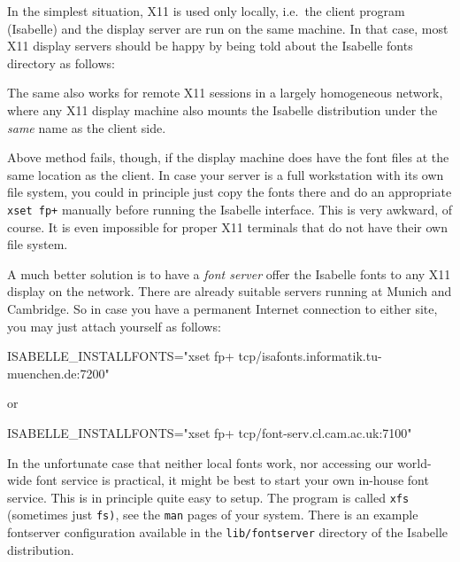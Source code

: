 \medskip In the simplest situation, X11 is used only locally, i.e.\ the client
program (Isabelle) and the display server are run on the same machine. In that
case, most X11 display servers should be happy by being told about the
Isabelle fonts directory as follows:
The same also works for remote X11 sessions in a largely homogeneous network,
where any X11 display machine also mounts the Isabelle distribution under the
\emph{same} name as the client side.

\medskip Above method fails, though, if the display machine does have the font
files at the same location as the client. In case your server is a full
workstation with its own file system, you could in principle just copy the
fonts there and do an appropriate \texttt{xset~fp+} manually before running
the Isabelle interface. This is very awkward, of course. It is even impossible
for proper X11 terminals that do not have their own file system.

A much better solution is to have a \emph{font server} offer the Isabelle
fonts to any X11 display on the network.  There are already suitable servers
running at Munich and Cambridge. So in case you have a permanent Internet
connection to either site, you may just attach yourself as follows:
\begin{ttbox}
ISABELLE_INSTALLFONTS="xset fp+ tcp/isafonts.informatik.tu-muenchen.de:7200"
\end{ttbox}
or
\begin{ttbox}
ISABELLE_INSTALLFONTS="xset fp+ tcp/font-serv.cl.cam.ac.uk:7100"
\end{ttbox}

\medskip In the unfortunate case that neither local fonts work, nor accessing
our world-wide font service is practical, it might be best to start your own
in-house font service. This is in principle quite easy to setup. The program
is called \texttt{xfs} (sometimes just \texttt{fs)}, see the \texttt{man}
pages of your system. There is an example fontserver configuration available
in the \texttt{lib/fontserver} directory of the Isabelle distribution.


